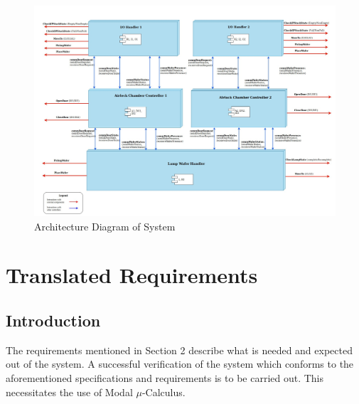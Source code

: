 \documentclass[a4paper,12pt]{article}
\begin{document}
\begin{figure}[ht]
\centering
    \includegraphics[width=\textwidth]{Architecture-final.jpg}
  \caption{Architecture Diagram of System}
  \label{fig:arch1}
\end{figure}
\newpage
\section{Translated Requirements}
\subsection{Introduction}
The requirements mentioned in Section 2 describe what is needed and expected out of the system. A successful verification of the system which conforms to the aforementioned specifications and requirements is to be carried out. This necessitates the use of Modal $\mu$-Calculus.   
\end{document}
